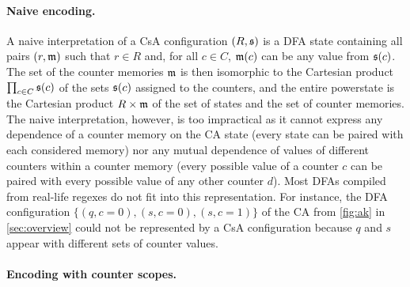 \documentclass[acmsmall,screen]{acmart}
\begin{document}
\paragraph{Naive encoding.}

A naive interpretation of a CsA configuration $(R,\mathfrak{s})$ is
a DFA state containing all pairs $(r,\mathfrak{m})$ such that
$r\in R$ and, for all $c\in C$, $\mathfrak{m}(c)$ can be any value from $\mathfrak{s}(c)$.
%
The set of the counter memories $\mathfrak{m}$ is then isomorphic to 
the Cartesian product $\prod_{c\in C}\mathfrak{s}(c)$ of the sets  $\mathfrak{s}(c)$ assigned to the counters, 
and the entire powerstate is the Cartesian product $R\times \mathfrak{m}$ of the set of states and the set of counter memories.
%
The naive interpretation, however, is too impractical as it cannot express any
dependence of a counter memory on the CA state (every state can be paired with
each considered memory) nor any mutual dependence of values of different
counters within a counter memory (every possible value of a counter $c$ can be
paired with every possible value of any other counter $d$).
%
Most DFAs compiled from real-life regexes do not fit into this
representation.
%
For instance, the DFA configuration $\{(q,c=0),(s,c=0),(s,c=1)\}$ of the CA from
\cref{fig:ak} in \cref{sec:overview} could not be represented by a CsA
configuration because $q$ and $s$ appear with different sets of counter values.

\paragraph{Encoding with counter scopes.}
\end{document}
